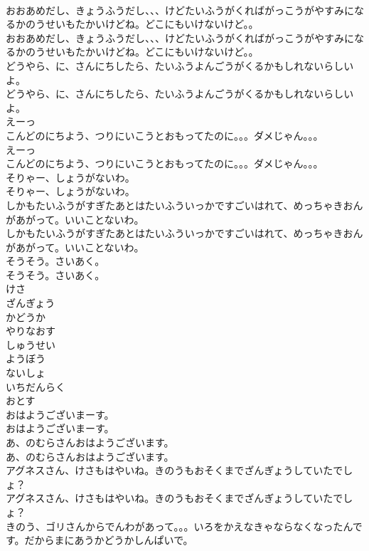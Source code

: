 \documentclass[8pt]{extreport}
\begin{document}
\begin{CJK}{UTF8}{min}
\\	おおあめだし、きょうふうだし、、、けどたいふうがくればがっこうがやすみになるかのうせいもたかいけどね。どこにもいけないけど。。
\\	おおあめだし、きょうふうだし、、、けどたいふうがくればがっこうがやすみになるかのうせいもたかいけどね。どこにもいけないけど。。
\\	どうやら、に、さんにちしたら、たいふうよんごうがくるかもしれないらしいよ。
\\	どうやら、に、さんにちしたら、たいふうよんごうがくるかもしれないらしいよ。
\\	えーっ
\\	こんどのにちよう、つりにいこうとおもってたのに。。。ダメじゃん。。。
\\	えーっ
\\	こんどのにちよう、つりにいこうとおもってたのに。。。ダメじゃん。。。
\\	そりゃー、しょうがないわ。
\\	そりゃー、しょうがないわ。
\\	しかもたいふうがすぎたあとはたいふういっかですごいはれて、めっちゃきおんがあがって。いいことないわ。
\\	しかもたいふうがすぎたあとはたいふういっかですごいはれて、めっちゃきおんがあがって。いいことないわ。
\\	そうそう。さいあく。
\\	そうそう。さいあく。
\\	けさ
\\	ざんぎょう
\\	かどうか
\\	やりなおす
\\	しゅうせい
\\	ようぼう
\\	ないしょ
\\	いちだんらく
\\	おとす
\\	おはようございまーす。
\\	おはようございまーす。
\\	あ、のむらさんおはようございます。
\\	あ、のむらさんおはようございます。
\\	アグネスさん、けさもはやいね。きのうもおそくまでざんぎょうしていたでしょ？
\\	アグネスさん、けさもはやいね。きのうもおそくまでざんぎょうしていたでしょ？
\\	きのう、ゴリさんからでんわがあって。。。いろをかえなきゃならなくなったんです。だからまにあうかどうかしんぱいで。

\end{CJK}
\end{document}
